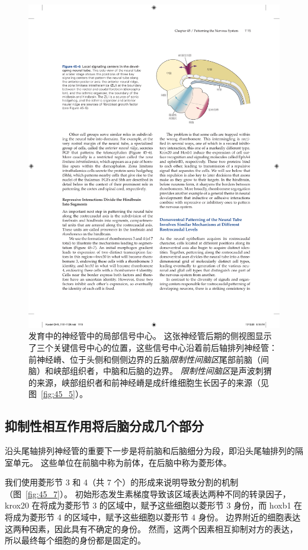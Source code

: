 \begin{figure}[htbp]
	\centering
	\includegraphics[width=0.76\linewidth]{chap45/fig_45_6}
	\caption{发育中的神经管中的局部信号中心。
		这张神经管后期的侧视图显示了三个关键信号中心的位置，这些信号中心沿着前后轴排列神经管：
		前神经嵴、位于头侧和侧侧边界的丘脑\textit{限制性间脑区}尾部前脑（间脑）和峡部组织者，中脑和后脑的边界。
		\textit{限制性间脑区}是声波刺猬的来源，峡部组织者和前神经嵴是成纤维细胞生长因子的来源（见图~\ref{fig:45_5}）。}
	\label{fig:45_6}
\end{figure}



\subsection{抑制性相互作用将后脑分成几个部分}

沿头尾轴排列神经管的重要下一步是将前脑和后脑细分为段，即沿头尾轴排列的隔室单元。
这些单位在前脑中称为前体，在后脑中称为菱形体。


我们使用菱形节 3 和 4（共 7 个）的形成来说明导致分割的机制（图~\ref{fig:45_7}）。
初始形态发生素梯度导致该区域表达两种不同的转录因子，krox20 在将成为菱形节 3 的区域中，赋予这些细胞以菱形节 3 身份，而 hoxb1 在将成为菱形节 4 的区域中，赋予这些细胞以菱形节 4 身份。
边界附近的细胞表达这两种因素，因此具有不确定的身份。
然而，这两个因素相互抑制对方的表达，所以最终每个细胞的身份都是固定的。


